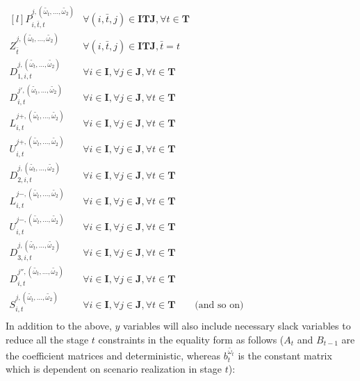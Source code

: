 \documentclass[12pt,a4paper]{article}
\begin{document}
$
\begin{matrix*}[l]
P_{i,\bar{t},t}^{j,(\tilde{\omega_t},\ldots ,\tilde{\omega_2})} & \forall (i,\bar{t},j)\in \textbf{ITJ}, \forall t \in \textbf{T}\\
Z_{\bar{t}}^{j,(\tilde{\omega_t},\ldots ,\tilde{\omega_2})} &  \forall (i,\bar{t},j)\in \textbf{ITJ}, \bar{t}=t\\
D_{1,i,t}^{j,(\tilde{\omega_t},\ldots ,\tilde{\omega_2})} &  \forall i \in \textbf{I}, \forall j \in \textbf{J}, \forall t \in \textbf{T}\\
D_{i,t}^{j{'},(\tilde{\omega_t},\ldots ,\tilde{\omega_2})}  & \forall i \in \textbf{I}, \forall j \in \textbf{J}, \forall t \in \textbf{T} \\
L_{i,t}^{j{+},(\tilde{\omega_t},\ldots ,\tilde{\omega_2})}  & \forall i \in \textbf{I}, \forall j \in \textbf{J}, \forall t \in \textbf{T} \\
U_{i,t}^{j{+},(\tilde{\omega_t},\ldots ,\tilde{\omega_2})} & \forall i \in \textbf{I}, \forall j \in \textbf{J}, \forall t \in \textbf{T} \\
D_{2,i,t}^{j,(\tilde{\omega_t},\ldots ,\tilde{\omega_2})} & \forall i \in \textbf{I}, \forall j \in \textbf{J}, \forall t \in \textbf{T} \\
L_{i,t}^{j{-},(\tilde{\omega_t},\ldots ,\tilde{\omega_2})} & \forall i \in \textbf{I}, \forall j \in \textbf{J}, \forall t \in \textbf{T} \\ 
U_{i,t}^{j{-},(\tilde{\omega_t},\ldots ,\tilde{\omega_2})} & \forall i \in \textbf{I}, \forall j \in \textbf{J}, \forall t \in \textbf{T} \\
D_{3,i,t}^{j,(\tilde{\omega_t},\ldots ,\tilde{\omega_2})} & \forall i \in \textbf{I}, \forall j \in \textbf{J}, \forall t \in \textbf{T} \\
D_{i,t}^{j{''},(\tilde{\omega_t},\ldots ,\tilde{\omega_2})} & \forall i \in \textbf{I}, \forall j \in \textbf{J}, \forall t \in \textbf{T} \\ 
S_{i,t}^{j,(\tilde{\omega_t},\ldots ,\tilde{\omega_2})} & \forall i \in \textbf{I}, \forall j \in \textbf{J}, \forall t \in \textbf{T} \qquad \text{(and so on)}\\
\end{matrix*}
$ \\
In addition to the above, $y$ variables will also include necessary slack variables to reduce all the stage $t$ constraints in the equality form as follows ($A_{t}$ and $B_{t-1}$ are the coefficient matrices and deterministic, whereas $b_t^{\tilde{\omega_t}}$ is the constant matrix which is dependent on scenario realization in stage $t$): \\
\end{document}
